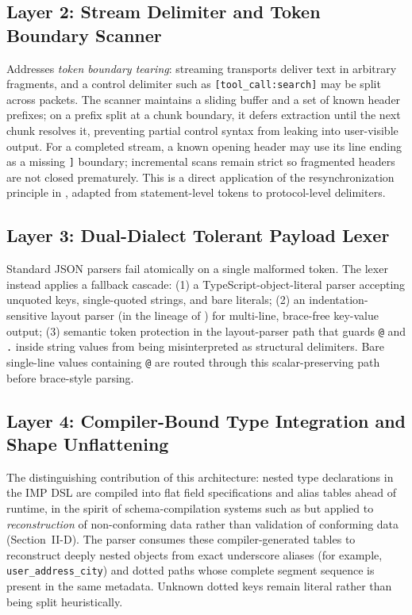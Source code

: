 \documentclass[conference]{IEEEtran}
\begin{document}
\subsection{Layer 2: Stream Delimiter and Token Boundary Scanner}
Addresses \emph{token boundary tearing}: streaming transports deliver text
in arbitrary fragments, and a control delimiter such as
\texttt{[tool\_call:search]} may be split across packets. The scanner
maintains a sliding buffer and a set of known header prefixes; on a
prefix split at a chunk boundary, it defers extraction until the next
chunk resolves it, preventing partial control syntax from leaking into
user-visible output. For a completed stream, a known opening header may
use its line ending as a missing \texttt{]} boundary; incremental scans
remain strict so fragmented headers are not closed prematurely. This is a
direct application of the
resynchronization principle in \cite{burkefisher}, adapted from
statement-level tokens to protocol-level delimiters.

\subsection{Layer 3: Dual-Dialect Tolerant Payload Lexer}
Standard JSON parsers fail atomically on a single malformed token. The
lexer instead applies a fallback cascade: (1) a TypeScript-object-literal
parser accepting unquoted keys, single-quoted strings, and bare literals;
(2) an indentation-sensitive layout parser (in the lineage of
\cite{yamlspec}) for multi-line, brace-free key-value output; (3)
semantic token protection in the layout-parser path that guards
\texttt{@} and \texttt{.} inside string values from being misinterpreted
as structural delimiters. Bare single-line values containing \texttt{@}
are routed through this scalar-preserving path before brace-style parsing.

\subsection{Layer 4: Compiler-Bound Type Integration and Shape Unflattening}
The distinguishing contribution of this architecture: nested type
declarations in the IMP DSL are compiled into flat field specifications
and alias tables ahead of runtime, in the spirit of schema-compilation
systems such as \cite{protobuf,graphqlspec} but applied to
\emph{reconstruction} of non-conforming data rather than validation of
conforming data (Section~II-D). The parser consumes these
compiler-generated tables to reconstruct deeply nested objects from exact
underscore aliases (for example, \texttt{user\_address\_city}) and dotted
paths whose complete segment sequence is present in the same metadata.
Unknown dotted keys remain literal rather than being split heuristically.
\end{document}
